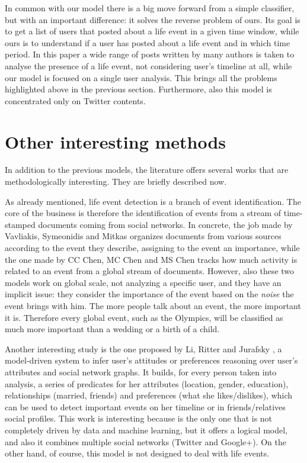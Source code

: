 In common with our model there is a big move forward from a simple classifier, but with an important difference: it solves the reverse problem of ours. Its goal is to get a list of users that posted about a life event in a given time window, while ours is to understand if a user has posted about a life event and in which time period. In this paper a wide range of posts written by many authors is taken to analyse the presence of a life event, not considering user's timeline at all, while our model is focused on a single user analysis. This brings all the problems highlighted above in the previous section. Furthermore, also this model is  concentrated only on Twitter contents.

\section{Other interesting methods}
In addition to the previous models, the literature offers several works that are methodologically interesting. They are briefly described now.

As already mentioned, life event detection is a branch of event identification. The core of the business is therefore the identification of events from a stream of time-stamped documents coming from social networks. In concrete, the job made by Vavliakis, Symeonidis and Mitkas \cite{vavliakis2013event} organizes documents from various sources according to the event they describe, assigning to the event an importance, while the one made by CC Chen, MC Chen and MS Chen \cite{chen2009adaptive} tracks how much activity is related to an event from a global stream of documents. However, also these two models work on global scale, not analyzing a specific user, and they have an implicit issue: they consider the importance of the event based on the \emph{noise} the event brings with him. The more people talk about an event, the more important it is. Therefore every global event, such as the Olympics, will be classified as much more important than a wedding or a birth of a child.

Another interesting study is the one proposed by Li, Ritter and Jurafsky \cite{li2014inferring}, a model-driven system to infer user's attitudes or preferences reasoning over user's attributes and social network graphs. It builds, for every person taken into analysis, a series of predicates for her attributes (location, gender, education), relationships (married, friends) and preferences (what she likes/dislikes), which can be used to detect important events on her timeline or in friends/relatives social profiles. This work is interesting because is the only one that is not completely driven by data and machine learning, but it offers a logical model, and also it combines multiple social networks (Twitter and Google+). On the other hand, of course, this model is not designed to deal with life events.

